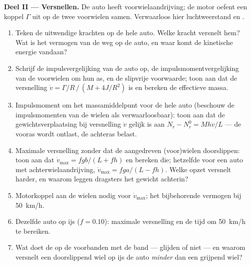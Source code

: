\begin{problem}
\medskip
\noindent\textbf{Deel II --- Versnellen.}
De auto heeft voorwielaandrijving; de motor oefent een koppel $\Gamma$ uit
op de twee voorwielen samen. Verwaarloos hier luchtweerstand en .
\begin{enumerate}[resume]
  \item Teken de uitwendige krachten op de hele auto. Welke kracht
        versnelt hem? Wat is het vermogen van de weg op de auto, en waar
        komt de kinetische energie vandaan?
  \item Schrijf de impulsvergelijking van de auto op, de
        impulsmomentvergelijking van de voorwielen om hun as, en de
        slipvrije voorwaarde; toon aan dat de versnelling
        $\dot v =
        \Gamma/R\,/\,(M + 4J/R^2)$ is en bereken de effectieve
        massa.
  \item Impulsmoment om het massamiddelpunt voor de hele auto (beschouw de
        impulsmomenten van de wielen als verwaarloosbaar): toon aan dat de
        gewichtsverplaatsing bij versnelling $\dot v$ gelijk is aan
        $N_r - N_r^0 =
        Mh\dot v/L$ --- de vooras wordt ontlast, de
        achteras belast.
  \item Maximale versnelling zonder dat de aangedreven (voor)wielen
        doorslippen: toon aan dat $\dot v_{\max} = fgb/(L + fh)$ en bereken
        die; hetzelfde voor een auto met achterwielaandrijving,
        $\dot v_{\max} =
        fga/(L - fh)$. Welke opzet versnelt harder, en
        waarom leggen dragsters het gewicht achterin?
  \item Motorkoppel aan de wielen nodig voor $\dot v_{\max}$; het
        bijbehorende vermogen bij \qty{50}{km/h}.
  \item Dezelfde auto op ijs ($f = 0.10$): maximale versnelling en de tijd
        om \qty{50}{km/h} te bereiken.
  \item Wat doet de  op de voorbanden met de band ---
        glijden of niet --- en waarom versnelt een doorslippend wiel op ijs
        de auto \emph{minder} dan een grijpend wiel?
\end{enumerate}


\end{problem}

